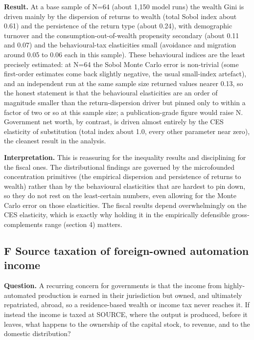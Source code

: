 \documentclass[12pt]{article}
\begin{document}
\textbf{Result.} At a base sample of N=64 (about 1,150 model runs) the
wealth Gini is driven mainly by the dispersion of returns to wealth
(total Sobol index about 0.61) and the persistence of the return type
(about 0.24), with demographic turnover and the
consumption-out-of-wealth propensity secondary (about 0.11 and 0.07) and
the behavioural-tax elasticities small (avoidance and migration around
0.05 to 0.06 each in this sample). These behavioural indices are the
least precisely estimated: at N=64 the Sobol Monte Carlo error is
non-trivial (some first-order estimates come back slightly negative, the
usual small-index artefact), and an independent run at the same sample
size returned values nearer 0.13, so the honest statement is that the
behavioural elasticities are an order of magnitude smaller than the
return-dispersion driver but pinned only to within a factor of two or so
at this sample size; a publication-grade figure would raise N.
Government net worth, by contrast, is driven almost entirely by the CES
elasticity of substitution (total index about 1.0, every other parameter
near zero), the cleanest result in the analysis.

\textbf{Interpretation.} This is reassuring for the inequality results
and disciplining for the fiscal ones. The distributional findings are
governed by the microfounded concentration primitives (the empirical
dispersion and persistence of returns to wealth) rather than by the
behavioural elasticities that are hardest to pin down, so they do not
rest on the least-certain numbers, even allowing for the Monte Carlo
error on those elasticities. The fiscal results depend overwhelmingly on
the CES elasticity, which is exactly why holding it in the empirically
defensible gross-complements range (section 4) matters.

\hypertarget{f-source-taxation-of-foreign-owned-automation-income}{%
\subsection{F \textperiodcentered{} Source taxation of foreign-owned automation
income}\label{f-source-taxation-of-foreign-owned-automation-income}}

\textbf{Question.} A recurring concern for governments is that the
income from highly-automated production is earned in their jurisdiction
but owned, and ultimately repatriated, abroad, so a residence-based
wealth or income tax never reaches it. If instead the income is taxed at
SOURCE, where the output is produced, before it leaves, what happens to
the ownership of the capital stock, to revenue, and to the domestic
distribution?
\end{document}
